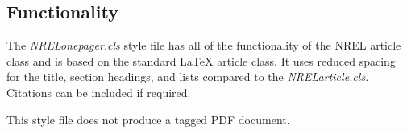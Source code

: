 \documentclass[draft]{NRELonepager}
\begin{document}
\subsection{Functionality}
The \emph{NRELonepager.cls} style file has all of the functionality of the NREL article class and is based on the standard LaTeX article class. It uses reduced spacing for the title, section headings, and lists compared to the \emph{NRELarticle.cls}. Citations can be included if required.

This style file does not produce a tagged PDF document.

\label{sec:Bib}
\printbibliography
\end{document}
